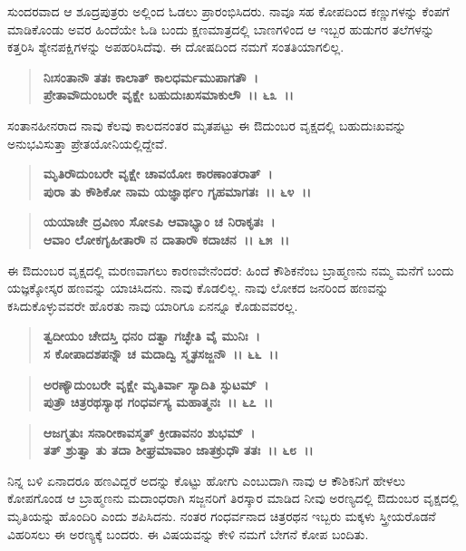 ಸುಂದರವಾದ ಆ ಶೂದ್ರಪುತ್ರರು ಅಲ್ಲಿಂದ ಓಡಲು ಪ್ರಾರಂಭಿಸಿದರು. ನಾವೂ ಸಹ ಕೋಪದಿಂದ ಕಣ್ಣುಗಳನ್ನು ಕೆಂಪಗೆ ಮಾಡಿಕೊಂಡು ಅವರ ಹಿಂದೆಯೇ ಓಡಿ ಬಂದು ಕ್ಷಣಮಾತ್ರದಲ್ಲಿ ಬಾಣಗಳಿಂದ ಆ ಇಬ್ಬರ ಹುಡುಗರ ತಲೆಗಳನ್ನು ಕತ್ತರಿಸಿ ಶ್ಯೇನಪಕ್ಷಿಗಳನ್ನು ಅಪಹರಿಸಿದೆವು. ಈ ದೋಷದಿಂದ ನಮಗೆ ಸಂತತಿಯಾಗಲಿಲ್ಲ.

\begin{verse}
\textbf{ನಿಃಸಂತಾನೌ ತತಃ ಕಾಲಾತ್ ಕಾಲಧರ್ಮಮುಪಾಗತೌ~।}\\\textbf{ಪ್ರೇತಾವೌದುಂಬರೇ ವೃಕ್ಷೇ ಬಹುದುಃಖಸಮಾಕುಲೌ~।। ೬೩~।।}
\end{verse}

ಸಂತಾನಹೀನರಾದ ನಾವು ಕೆಲವು ಕಾಲದನಂತರ ಮೃತಪಟ್ಟು ಈ ಔದುಂಬರ ವೃಕ್ಷದಲ್ಲಿ ಬಹುದುಃಖವನ್ನು ಅನುಭವಿಸುತ್ತಾ ಪ್ರೇತಯೋನಿಯಲ್ಲಿದ್ದೇವೆ.

\begin{verse}
\textbf{ಮೃತಿರೌ‌ದುಂಬರೇ ವೃಕ್ಷೇ ಚಾವಯೋಃ ಕಾರಣಾಂತರಾತ್~।}\\\textbf{ಪುರಾ ತು ಕೌಶಿಕೋ ನಾಮ ಯಜ್ಞಾರ್ಥಂ ಗೃಹಮಾಗತಃ~।। ೬೪~।।}
\end{verse}

\begin{verse}
\textbf{ಯಯಾಚೇ ದ್ರವಿಣಂ ಸೋಽಪಿ ಆವಾಭ್ಯಾಂ ಚ ನಿರಾಕೃತಃ~।}\\\textbf{ಆವಾಂ ಲೋಕಗೃಹೀತಾರೌ ನ ದಾತಾರೌ ಕದಾಚನ~।। ೬೫~।।}
\end{verse}

ಈ ಔದುಂಬರ ವೃಕ್ಷದಲ್ಲಿ ಮರಣವಾಗಲು ಕಾರಣವೇನೆಂದರೆ: ಹಿಂದೆ ಕೌಶಿಕನೆಂಬ ಬ್ರಾಹ್ಮಣನು ನಮ್ಮ ಮನೆಗೆ ಬಂದು ಯಜ್ಞಕ್ಕೋಸ್ಕರ ಹಣವನ್ನು ಯಾಚಿಸಿದನು. ನಾವು ಕೊಡಲಿಲ್ಲ. ನಾವು ಲೋಕದ ಜನರಿಂದ ಹಣವನ್ನು ಕಸಿದುಕೊಳ್ಳುವವರೇ ಹೊರತು ನಾವು ಯಾರಿಗೂ ಏನನ್ನೂ ಕೊಡುವವರಲ್ಲ.

\begin{verse}
\textbf{ತ್ವದೀಯಂ ಚೇದಸ್ತಿ ಧನಂ ದತ್ವಾ ಗಚ್ಛೇತಿ ವೈ ಮುನಿಃ~।}\\\textbf{ಸ ಕೋಪಾದಶಪನ್ನೌ ಚ ಮದಾದ್ವಿ ಸ್ಮೃತಸಜ್ಜನೌ~।। ೬೬~।।} 
\end{verse}

\begin{verse}
\textbf{ಅರಣ್ಯೌದುಂಬರೇ ವೃಕ್ಷೇ ಮೃತಿರ್ವಾ ಸ್ಯಾದಿತಿ ಸ್ಫುಟಮ್~।}\\\textbf{ಪುತ್ರೌ ಚಿತ್ರರಥಸ್ಯಾಥ ಗಂಧರ್ವಸ್ಯ ಮಹಾತ್ಮನಃ~।। ೬೭~।।} 
\end{verse}

\begin{verse}
\textbf{ಆಜಗ್ಮತುಃ ಸನಾರೀಕಾವಸ್ಮತ್ ಕ್ರೀಡಾವನಂ ಶುಭಮ್~।}\\\textbf{ತತ್ ಶ್ರುತ್ವಾ ತು ತದಾ ಶೀಘ್ರಮಾವಾಂ ಜಾತಕ್ರುಧೌ ತತಃ~।। ೬೮~।।}
\end{verse}

ನಿನ್ನ ಬಳಿ ಏನಾದರೂ ಹಣವಿದ್ದರೆ ಅದನ್ನು ಕೊಟ್ಟು ಹೋಗು ಎಂಬುದಾಗಿ ನಾವು ಆ ಕೌಶಿಕನಿಗೆ ಹೇಳಲು ಕೋಪಗೊಂಡ ಆ ಬ್ರಾಹ್ಮಣನು ಮದಾಂಧರಾಗಿ ಸಜ್ಜನರಿಗೆ ತಿರಸ್ಕಾರ ಮಾಡಿದ ನೀವು ಅರಣ್ಯದಲ್ಲಿ ಔದುಂಬರ ವೃಕ್ಷದಲ್ಲಿ ಮೃತಿಯನ್ನು ಹೊಂದಿರಿ ಎಂದು ಶಪಿಸಿದನು. ನಂತರ ಗಂಧರ್ವನಾದ ಚಿತ್ರರಥನ ಇಬ್ಬರು ಮಕ್ಕಳು ಸ್ತ್ರೀಯರೊಡನೆ ವಿಹರಿಸಲು ಈ ಅರಣ್ಯಕ್ಕೆ ಬಂದರು. ಈ ವಿಷಯವನ್ನು ಕೇಳಿ ನಮಗೆ ಬೇಗನೆ ಕೋಪ ಬಂದಿತು.

